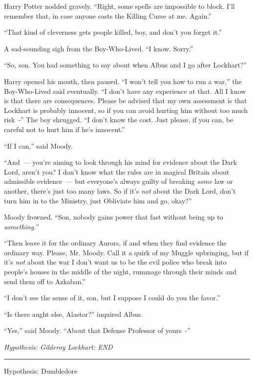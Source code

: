 Harry Potter nodded gravely. ``Right, some spells are impossible to block. I'll remember that, in case anyone casts the Killing Curse at me. Again.''

``That kind of cleverness gets people killed, boy, and don't you forget it.''

A sad-sounding sigh from the Boy-Who-Lived. ``I know. Sorry.''

``So, son. You had something to say about when Albus and I go after Lockhart?''

Harry opened his mouth, then paused. ``I won't tell you how to run a war,'' the Boy-Who-Lived said eventually. ``I don't have any experience at that. All I know is that there are consequences. Please be advised that my own assessment is that Lockhart is probably innocent, so if you can avoid hurting him without too much risk~-'' The boy shrugged. ``I don't know the cost. Just please, if you can, be careful not to hurt him if he's innocent.''

``If I can,'' said Moody.

``And~--- you're aiming to look through his mind for evidence about the Dark Lord, aren't you? I don't know what the rules are in magical Britain about admissible evidence~--- but everyone's always guilty of breaking \emph{some} law or another, there's just too many laws. So if it's \emph{not} about the Dark Lord, don't turn him in to the Ministry, just Obliviate him and go, okay?''

Moody frowned. ``Son, nobody gains power that fast without being up to \emph{something.}''

``Then leave it for the ordinary Aurors, if and when they find evidence the ordinary way. Please, Mr. Moody. Call it a quirk of my Muggle upbringing, but if it's \emph{not} about the war I don't want us to be the evil police who break into people's houses in the middle of the night, rummage through their minds and send them off to Azkaban.''

``I don't see the sense of it, son, but I suppose I could do you the favor.''

``Is there aught else, Alastor?'' inquired Albus.

``Yes,'' said Moody. ``About that Defense Professor of yours~-''

\emph{Hypothesis: Gilderoy Lockhart: END}

\begin{center}\rule{3in}{0.4pt}\end{center}

Hypothesis: Dumbledore


